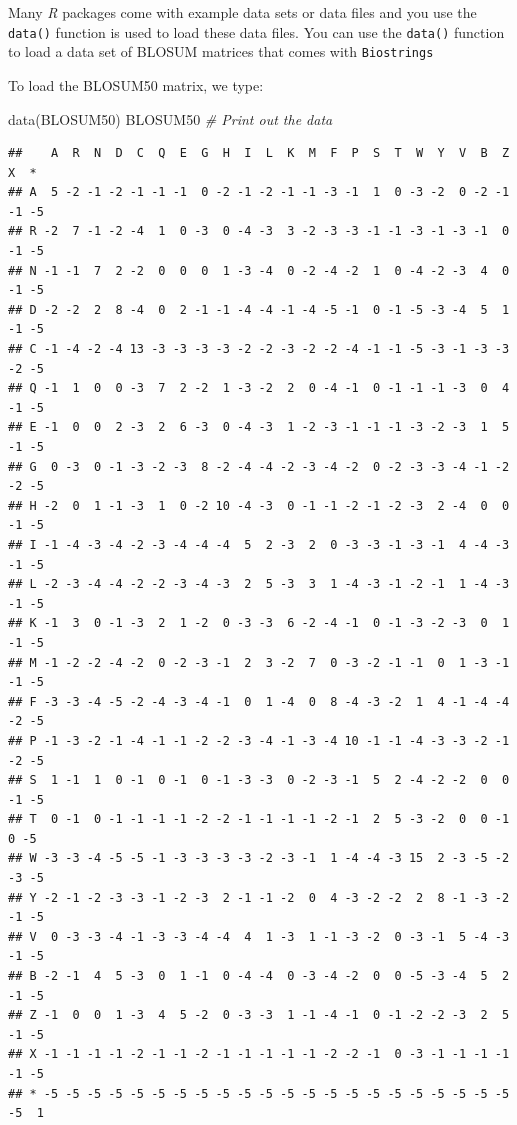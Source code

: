 \documentclass[
]{book}
\newenvironment{Shaded}{\begin{snugshade}}{\end{snugshade}}
\newcommand{\CommentTok}[1]{\textcolor[rgb]{0.56,0.35,0.01}{\textit{#1}}}
\newcommand{\FunctionTok}[1]{\textcolor[rgb]{0.00,0.00,0.00}{#1}}
\newcommand{\NormalTok}[1]{#1}
\begin{document}
Many \emph{R} packages come with example data sets or data files and you use the \texttt{data()} function is used to load these data files. You can use the \texttt{data()} function to load a data set of BLOSUM matrices that comes with \texttt{Biostrings}

To load the BLOSUM50 matrix, we type:

\begin{Shaded}
\begin{Highlighting}[]
\FunctionTok{data}\NormalTok{(BLOSUM50)}
\NormalTok{BLOSUM50 }\CommentTok{\# Print out the data}
\end{Highlighting}
\end{Shaded}

\begin{verbatim}
##    A  R  N  D  C  Q  E  G  H  I  L  K  M  F  P  S  T  W  Y  V  B  Z  X  *
## A  5 -2 -1 -2 -1 -1 -1  0 -2 -1 -2 -1 -1 -3 -1  1  0 -3 -2  0 -2 -1 -1 -5
## R -2  7 -1 -2 -4  1  0 -3  0 -4 -3  3 -2 -3 -3 -1 -1 -3 -1 -3 -1  0 -1 -5
## N -1 -1  7  2 -2  0  0  0  1 -3 -4  0 -2 -4 -2  1  0 -4 -2 -3  4  0 -1 -5
## D -2 -2  2  8 -4  0  2 -1 -1 -4 -4 -1 -4 -5 -1  0 -1 -5 -3 -4  5  1 -1 -5
## C -1 -4 -2 -4 13 -3 -3 -3 -3 -2 -2 -3 -2 -2 -4 -1 -1 -5 -3 -1 -3 -3 -2 -5
## Q -1  1  0  0 -3  7  2 -2  1 -3 -2  2  0 -4 -1  0 -1 -1 -1 -3  0  4 -1 -5
## E -1  0  0  2 -3  2  6 -3  0 -4 -3  1 -2 -3 -1 -1 -1 -3 -2 -3  1  5 -1 -5
## G  0 -3  0 -1 -3 -2 -3  8 -2 -4 -4 -2 -3 -4 -2  0 -2 -3 -3 -4 -1 -2 -2 -5
## H -2  0  1 -1 -3  1  0 -2 10 -4 -3  0 -1 -1 -2 -1 -2 -3  2 -4  0  0 -1 -5
## I -1 -4 -3 -4 -2 -3 -4 -4 -4  5  2 -3  2  0 -3 -3 -1 -3 -1  4 -4 -3 -1 -5
## L -2 -3 -4 -4 -2 -2 -3 -4 -3  2  5 -3  3  1 -4 -3 -1 -2 -1  1 -4 -3 -1 -5
## K -1  3  0 -1 -3  2  1 -2  0 -3 -3  6 -2 -4 -1  0 -1 -3 -2 -3  0  1 -1 -5
## M -1 -2 -2 -4 -2  0 -2 -3 -1  2  3 -2  7  0 -3 -2 -1 -1  0  1 -3 -1 -1 -5
## F -3 -3 -4 -5 -2 -4 -3 -4 -1  0  1 -4  0  8 -4 -3 -2  1  4 -1 -4 -4 -2 -5
## P -1 -3 -2 -1 -4 -1 -1 -2 -2 -3 -4 -1 -3 -4 10 -1 -1 -4 -3 -3 -2 -1 -2 -5
## S  1 -1  1  0 -1  0 -1  0 -1 -3 -3  0 -2 -3 -1  5  2 -4 -2 -2  0  0 -1 -5
## T  0 -1  0 -1 -1 -1 -1 -2 -2 -1 -1 -1 -1 -2 -1  2  5 -3 -2  0  0 -1  0 -5
## W -3 -3 -4 -5 -5 -1 -3 -3 -3 -3 -2 -3 -1  1 -4 -4 -3 15  2 -3 -5 -2 -3 -5
## Y -2 -1 -2 -3 -3 -1 -2 -3  2 -1 -1 -2  0  4 -3 -2 -2  2  8 -1 -3 -2 -1 -5
## V  0 -3 -3 -4 -1 -3 -3 -4 -4  4  1 -3  1 -1 -3 -2  0 -3 -1  5 -4 -3 -1 -5
## B -2 -1  4  5 -3  0  1 -1  0 -4 -4  0 -3 -4 -2  0  0 -5 -3 -4  5  2 -1 -5
## Z -1  0  0  1 -3  4  5 -2  0 -3 -3  1 -1 -4 -1  0 -1 -2 -2 -3  2  5 -1 -5
## X -1 -1 -1 -1 -2 -1 -1 -2 -1 -1 -1 -1 -1 -2 -2 -1  0 -3 -1 -1 -1 -1 -1 -5
## * -5 -5 -5 -5 -5 -5 -5 -5 -5 -5 -5 -5 -5 -5 -5 -5 -5 -5 -5 -5 -5 -5 -5  1
\end{verbatim}
\end{document}
